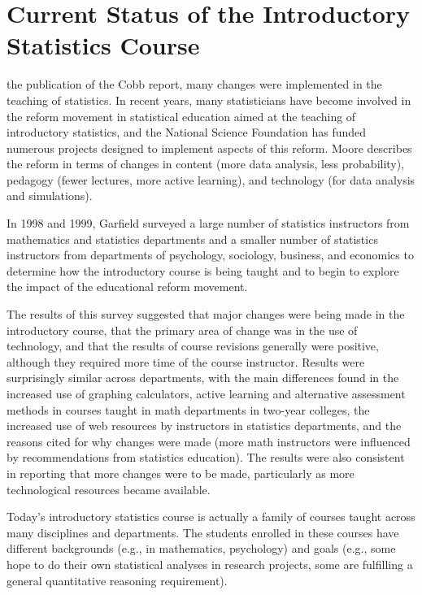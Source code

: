 \section{\textbf{Current Status of the Introductory Statistics Course}}

the publication of the Cobb report, many changes were implemented in the teaching of statistics. In recent years, many statisticians have become involved in the reform movement in statistical education aimed at the teaching of introductory statistics, and the National Science Foundation has funded numerous projects designed to implement aspects of this reform\cite{cobb2}. Moore\cite{moore} describes the reform in terms of changes in content (more data analysis, less probability), pedagogy (fewer lectures, more active learning), and technology (for data analysis and simulations).   

In 1998 and 1999, Garfield\cite{garfield} surveyed a large number of statistics instructors from mathematics and statistics departments and a smaller number of statistics instructors from departments of psychology, sociology, business, and economics to determine how the introductory course is being taught and to begin to explore the impact of the educational reform movement.
 
The results of this survey suggested that major changes were being made in the introductory course, that the primary area of change was in the use of technology, and that the results of course revisions generally were positive, although they required more time of the course instructor. Results were surprisingly similar across departments, with the main differences found in the increased use of graphing calculators, active learning and alternative assessment methods in courses taught in math departments in two-year colleges, the increased use of web resources by instructors in statistics departments, and the reasons cited for why changes were made (more math instructors were influenced by recommendations from statistics education).  The results were also consistent in reporting that more changes were to be made, particularly as more technological resources became available.

Today's introductory statistics course is actually a family of courses taught across many disciplines and departments. The students enrolled in these courses have different backgrounds (e.g., in mathematics, psychology) and goals (e.g., some hope to do their own statistical analyses in research projects, some are fulfilling a general quantitative reasoning requirement). 

